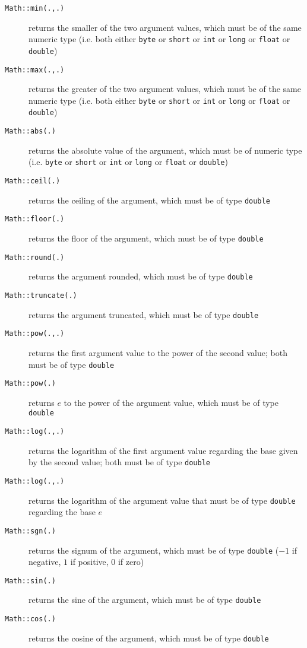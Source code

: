 \begin{description}
\item[\texttt{Math::min(.,.)}] returns the smaller of the two argument values, which must be of the same numeric type (i.e. both either \texttt{byte} or \texttt{short} or \texttt{int} or \texttt{long} or \texttt{float} or \texttt{double})
\item[\texttt{Math::max(.,.)}] returns the greater of the two argument values, which must be of the same numeric type (i.e. both either \texttt{byte} or \texttt{short} or \texttt{int} or \texttt{long} or \texttt{float} or \texttt{double})
\item[\texttt{Math::abs(.)}] returns the absolute value of the argument, which must be of numeric type (i.e. \texttt{byte} or \texttt{short} or \texttt{int} or \texttt{long} or \texttt{float} or \texttt{double})
\item[\texttt{Math::ceil(.)}] returns the ceiling of the argument, which must be of type \texttt{double}
\item[\texttt{Math::floor(.)}] returns the floor of the argument, which must be of type \texttt{double}
\item[\texttt{Math::round(.)}] returns the argument rounded, which must be of type \texttt{double}
\item[\texttt{Math::truncate(.)}] returns the argument truncated, which must be of type \texttt{double}
\item[\texttt{Math::pow(.,.)}] returns the first argument value to the power of the second value; both must be of type \texttt{double}
\item[\texttt{Math::pow(.)}] returns $e$ to the power of the argument value, which must be of type \texttt{double}
\item[\texttt{Math::log(.,.)}] returns the logarithm of the first argument value regarding the base given by the second value; both must be of type \texttt{double}
\item[\texttt{Math::log(.,.)}] returns the logarithm of the argument value that must be of type \texttt{double} regarding the base $e$
\item[\texttt{Math::sgn(.)}] returns the signum of the argument, which must be of type \texttt{double} ($-1$ if negative, $1$ if positive, $0$ if zero)
\item[\texttt{Math::sin(.)}] returns the sine of the argument, which must be of type \texttt{double}
\item[\texttt{Math::cos(.)}] returns the cosine of the argument, which must be of type \texttt{double}

\end{description}
